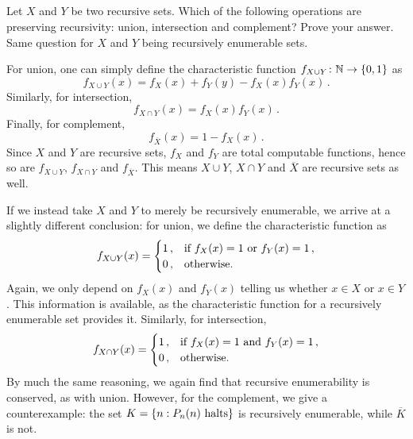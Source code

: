 \subsection{} %
Let \(X\) and \(Y\) be two recursive sets.
Which of the following operations are preserving recursivity:
union, intersection and complement?
Prove your answer.
Same question for \(X\) and \(Y\) being recursively enumerable sets.

\begin{solution}
	For union, one can simply define the characteristic function
	\(f_{X \cup Y} \colon \mathbb{N} \to \{0, 1\}\) as
	\begin{equation}
		f_{X \cup Y}(x) = f_X(x) + f_Y(y) - f_X(x)f_Y(x)\,.
	\end{equation}
	Similarly, for intersection,
	\begin{equation}
		f_{X \cap Y}(x) = f_X(x)f_Y(x)\,.
	\end{equation}
	Finally, for complement,
	\begin{equation}
		f_{\overline{X}}(x) = 1 - f_X(x)\,.
	\end{equation}
	Since \(X\) and \(Y\) are recursive sets, \(f_X\) and \(f_Y\)
	are total computable functions,
	hence so are \(f_{X \cup Y}\),
	\(f_{X \cap Y}\) and \(f_{\overline{X}}\).
	This means \(X \cup Y\), \(X \cap Y\) and \(\overline{X}\)
	are recursive sets as well.

	If we instead take \(X\) and \(Y\) to merely be recursively enumerable,
	we arrive at a slightly different conclusion:
	for union, we define the characteristic function as
	\begin{equation}
		f_{X \cup Y}(x) =
		\begin{cases}
			1\,, & \textnormal{if } f_X(x) = 1 \textnormal{ or } f_Y(x) = 1\,,\\
			0\,, & \textnormal{otherwise.}
		\end{cases}
	\end{equation}
	Again, we only depend on \(f_X(x)\) and \(f_Y(x)\) telling us
	whether \(x \in X\) or \(x \in Y\).
	This information is available, as the characteristic function
	for a recursively enumerable set provides it.
	Similarly, for intersection,
	\begin{equation}
		f_{X \cap Y}(x) =
		\begin{cases}
			1\,, & \textnormal{if } f_X(x) = 1 \textnormal{ and } f_Y(x) = 1\,,\\
			0\,, & \textnormal{otherwise.}
		\end{cases}
	\end{equation}
	By much the same reasoning,
	we again find that recursive enumerability is conserved, as with union.
	However, for the complement, we give a counterexample:
	the set \(K = \{n : P_n(n) \textnormal{ halts}\}\)
	is recursively enumerable, while \(\overline{K}\) is not.
\end{solution}

